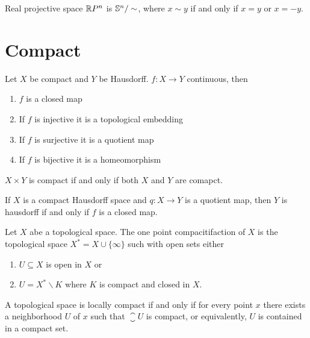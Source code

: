 \documentclass[twocolumn]{article}
\begin{document}
\begin{example}
	Real projective space $\R P^n$ is $\S^n \slash \sim$, where $x \sim y $ if and only if $ x = y$ or $x = -y$.
\end{example}

\section{Compact}

\begin{thm}
	Let $X$ be compact and $Y$ be Hausdorff. $f: X \rightarrow Y$ continuous, then
	\begin{enumerate}
		\item $f$ is a closed map
		\item If $f$ is injective it is a topological embedding
		\item If $f$ is surjective it is a quotient map 
		\item If $f$ is bijective it is a homeomorphism
	\end{enumerate}
\end{thm}

\begin{thm}
	$X \times Y$ is compact if and only if both $X$ and $Y$ are comapct.
\end{thm}

\begin{thm}
	If $X$ is a compact Hausdorff space and $q: X \rightarrow Y$ is a quotient map, then $Y$ is hausdorff if and only if $f$ is a closed map.
\end{thm}

\begin{defi}
	Let $X$ abe a topological space. 
	The one point compacitifaction of $X$ is the topological space $X^* = X \cup \{\infty\}$ such with open sets either 
	\begin{enumerate}
		\item $U \subseteq X$ is open in $X$ or
		\item $U = X^* \smallsetminus K$ where $K$ is compact and closed in $X$.
	\end{enumerate}
\end{defi}

\begin{defi}
	A topological space is locally compact if and only if for every point $x$ there exists a neighborhood $U$ of $x$ such that $\closure{U}$ is compact, or equivalently, $U$ is contained in a compact set.
\end{defi}
\end{document}
